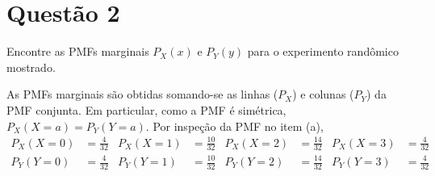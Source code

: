 \section{Questão 2}
Encontre as PMFs marginais $P_X(x)$ e $P_Y(y)$ para o experimento randômico mostrado.

\begin{respostas}

As PMFs marginais são obtidas somando-se as linhas ($P_X$) e colunas ($P_Y$) da PMF conjunta. 
Em particular, como a PMF é simétrica, $P_X(X=a) = P_Y(Y=a)$.
Por inspeção da PMF no item (a),
%
\begin{align}
    P_X(X=0) &= \frac{4}{32} &
    P_X(X=1) &= \frac{10}{32} &
    P_X(X=2) &= \frac{14}{32} &
    P_X(X=3) &= \frac{4}{32} 
\\
    P_Y(Y=0) &= \frac{4}{32} &
    P_Y(Y=1) &= \frac{10}{32} &
    P_Y(Y=2) &= \frac{14}{32} &
    P_Y(Y=3) &= \frac{4}{32}
\end{align}

\end{respostas}